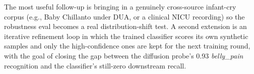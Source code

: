 \documentclass[final]{article}
\begin{document}
The most useful follow-up is bringing in a genuinely cross-source infant-cry corpus (e.g., Baby Chillanto under DUA, or a clinical NICU recording) so the robustness eval becomes a real distribution-shift test. A second extension is an iterative refinement loop in which the trained classifier scores its own synthetic samples and only the high-confidence ones are kept for the next training round, with the goal of closing the gap between the diffusion probe's 0.93 \textit{belly\_pain} recognition and the classifier's still-zero downstream recall.

\small


\end{document}
